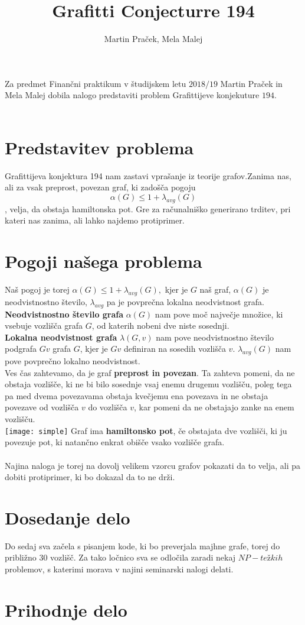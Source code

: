 \documentclass[12pt,a4paper]{amsart}
\begin{document}
\title{Grafitti Conjecturre 194}
\author{Martin Praček, Mela Malej}
\maketitle
Za predmet Finančni praktikum v študijskem letu $2018/19$ Martin Praček in Mela Malej dobila nalogo predstaviti problem Grafittijeve konjekuture $194$. \\\\
\section{Predstavitev problema}
Grafittijeva konjektura 194 nam zastavi vprašanje iz teorije grafov.Zanima nas, ali za vsak preprost, povezan graf, ki zadošča pogoju $$ \alpha(G) \leq 1 + \lambda_{avg}(G)$$, velja, da obstaja hamiltonska pot. Gre za računalniško generirano trditev, pri kateri nas zanima, ali lahko najdemo protiprimer.\\
\section{Pogoji našega problema}
Naš pogoj je torej $ \alpha(G) \leq 1 + \lambda_{avg}(G),$
kjer je $G$ naš graf, $\alpha(G)$ je neodvistnostno število, $\lambda_{avg}$ pa je povprečna lokalna neodvistnost grafa.\\
\textbf{Neodvistnostno število grafa} $\alpha(G)$ nam pove moč največje množice, ki vsebuje  vozlišča grafa $G$, od katerih nobeni dve niste sosednji.\\
\textbf{Lokalna neodvistnost grafa} $\lambda(G, v)$ nam pove neodvistnostno število podgrafa $Gv$ grafa $G$, kjer je $Gv$ definiran na sosedih vozlišča $v$. $\lambda_{avg}(G)$ nam pove povprečno lokalno neodvistnost.\\
Ves čas zahtevamo, da je graf \textbf{preprost in povezan}. Ta zahteva pomeni, da ne obstaja vozlišče, ki ne bi bilo sosednje vsaj enemu drugemu vozlišču, poleg tega pa med dvema povezavama obstaja kvečjemu ena povezava in ne obstaja  povezave od vozlišča $v$ do vozlišča $v$, kar pomeni da ne obstajajo zanke na enem vozlišču.\\
\texttt{[image: simple]}
Graf ima \textbf{hamiltonsko pot}, če obstajata dve vozlišči, ki ju povezuje pot, ki natančno enkrat obišče vsako vozlišče grafa.\\
\ \\
Najina naloga je torej na dovolj velikem vzorcu grafov pokazati da to velja, ali pa dobiti protiprimer, ki bo dokazal da to ne drži.\\
\section{Dosedanje delo}
Do sedaj sva začela s pisanjem kode, ki bo preverjala majhne grafe, torej do približno $30$ vozlišč. Za tako ločnico sva se odločila zaradi nekaj $NP-težkih$ problemov, s katerimi morava v najini seminarski nalogi delati.  
\section{Prihodnje delo}
\end{document}
